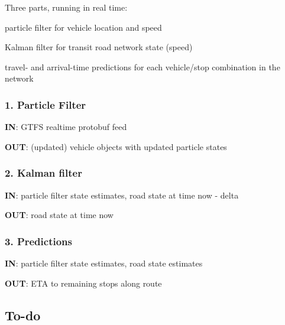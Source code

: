 Three parts, running in real time\+:
\begin{DoxyEnumerate}
\item particle filter for vehicle location and speed
\item Kalman filter for transit road network state (speed)
\item travel-\/ and arrival-\/time predictions for each vehicle/stop combination in the network
\end{DoxyEnumerate}

\subsubsection*{1. Particle Filter}

{\bfseries IN}\+: G\+T\+FS realtime protobuf feed

{\bfseries O\+UT}\+: (updated) vehicle objects with updated particle states

\subsubsection*{2. Kalman filter}

{\bfseries IN}\+: particle filter state estimates, road state at time {\ttfamily now -\/ delta}

{\bfseries O\+UT}\+: road state at time {\ttfamily now}

\subsubsection*{3. Predictions}

{\bfseries IN}\+: particle filter state estimates, road state estimates

{\bfseries O\+UT}\+: E\+TA to remaining stops along route

\subsection*{To-\/do}


